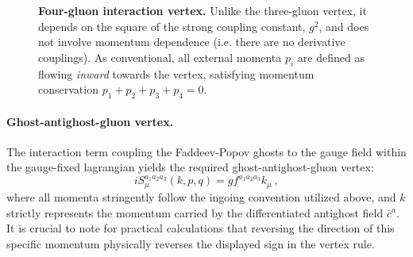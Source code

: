 \begin{figure}[H]
    \centering
    \begin{minipage}{0.5\textwidth}
        \caption{\textbf{Four-gluon interaction vertex.} Unlike the three-gluon vertex, it depends on the square of the strong coupling constant, \(g^2\), and does not involve momentum dependence (i.e. there are no derivative couplings). As conventional, all external momenta \(p_i\) are defined as flowing \textit{inward} towards the vertex, satisfying momentum conservation \(p_1 + p_2 + p_3 + p_4 = 0\).}
        \label{fig:four_gluon_vertex_detail}
    \end{minipage}
    \hfill
    \begin{minipage}{0.45\textwidth}
        \centering
    \end{minipage}
\end{figure}

\paragraph{Ghost-antighost-gluon vertex.}
The interaction term coupling the Faddeev-Popov ghosts to the gauge field within the gauge-fixed lagrangian yields the required ghost-antighost-gluon vertex:
\begin{equation} \label{eq:ghost_gluon_vertex}
    iS^{a_1 a_2 a_3}_\mu(k, p, q) = g f^{a_1 a_2 a_3} k_\mu \, ,
\end{equation}
where all momenta stringently follow the ingoing convention utilized above, and \(k\) strictly represents the momentum carried by the differentiated antighost field \(\bar{c}^a\). It is crucial to note for practical calculations that reversing the direction of this specific momentum physically reverses the displayed sign in the vertex rule.

